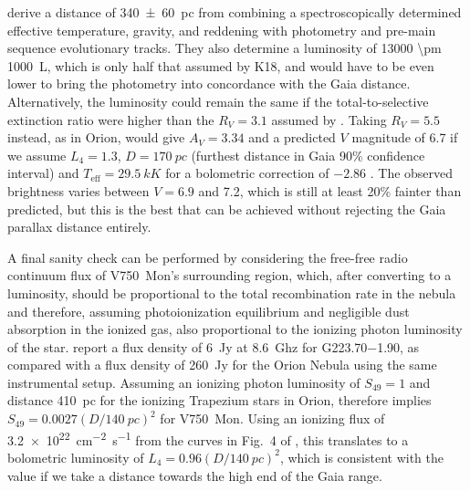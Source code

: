 \documentclass[useAMS, usenatbib, a4paper]{mnras}
\newcommand\hii{\ion{H}{ii}}
\begin{document}
\citet{Fairlamb:2015a} derive a distance of \SI{340 \pm 60}{pc} from
combining a spectroscopically determined effective temperature,
gravity, and reddening with photometry and pre-main sequence
evolutionary tracks.  They also determine a luminosity of \SI{13000
  \pm 1000}{L_\odot}, which is only half that assumed by K18, and
would have to be even lower to bring the photometry into concordance
with the Gaia distance.  Alternatively, the luminosity could remain
the same if the total-to-selective extinction ratio were higher than
the \(R_V = 3.1\) assumed by \citet{Fairlamb:2015a}.  Taking
\(R_V = 5.5\) instead, as in Orion, would give \(A_V = 3.34\) and a
predicted \(V\) magnitude of 6.7 if we assume \(L_4 = 1.3\),
\(D = \SI{170}{pc}\) (furthest distance in Gaia 90\% confidence
interval) and \(T_{\text{eff}} = \SI{29.5}{kK}\)
\citep{Fairlamb:2015a} for a bolometric correction of \(-2.86\)
\citep{Nieva:2013a}.  The observed brightness varies between
\(V = 6.9\) and 7.2, which is still at least 20\% fainter than
predicted, but this is the best that can be achieved without rejecting
the Gaia parallax distance entirely.

A final sanity check can be performed by considering the free-free
radio continuum flux of V750~Mon's surrounding \hii{} region, which,
after converting to a luminosity, should be proportional to the total
recombination rate in the nebula and therefore, assuming
photoionization equilibrium and negligible dust absorption in the
ionized gas, also proportional to the ionizing photon luminosity of
the star.  \citet{Quireza:2006b} report a flux density of \SI{6}{Jy}
at \SI{8.6}{Ghz} for G\num{223.70}\num{-1.90}, as compared with a flux
density of \SI{260}{Jy} for the Orion Nebula using the same
instrumental setup.  Assuming an ionizing photon luminosity of
\(S_{49} = 1\) and distance \SI{410}{pc} for the ionizing Trapezium
stars in Orion, therefore implies
\(S_{49} = 0.0027 (D/\SI{140}{pc})^2\) for V750~Mon.  Using an
ionizing flux of \SI{3.2e22}{cm^{-2}.s^{-1}} from the curves in Fig.~4
of \citet{Sternberg:2003a}, this translates to a bolometric luminosity
of \(L_4 = 0.96 (D/\SI{140}{pc})^2\), which is consistent with the
\citet{Fairlamb:2015a} value if we take a distance towards the high
end of the Gaia range.

\end{document}
